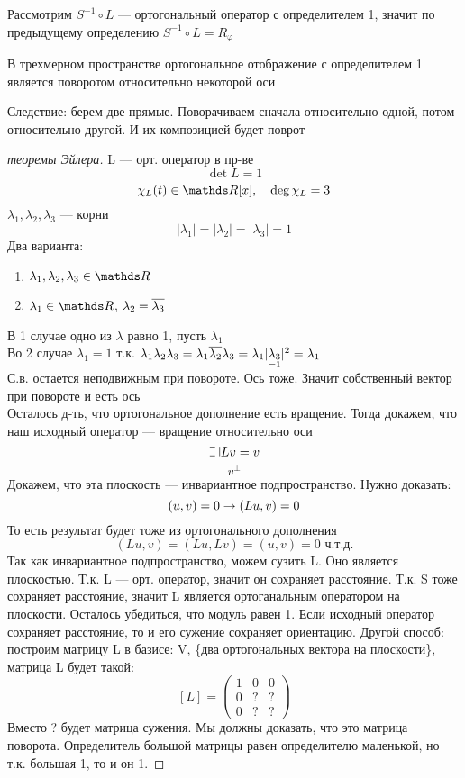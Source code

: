 \documentclass[main]{subfiles}
\begin{document}
    Рассмотрим $S^{-1} \circ L$ --- ортогональный оператор с определителем 1, значит по предыдущему определению $S^{-1} \circ L = R_{\varphi}$

    \begin{utv}
        В трехмерном пространстве ортогональное отображение с определителем 1 является поворотом относительно некоторой оси
    \end{utv}

    Следствие: берем две прямые. Поворачиваем сначала относительно одной, потом относительно другой. И их композицией будет поврот

    \begin{proof}[теоремы Эйлера]
        L --- орт. оператор в пр-ве
        \[\det L = 1\]
        \[\chi_L(t) \in \R[x],\q \deg \chi_L = 3\]
        $\lambda_1, \lambda_2, \lambda_3$ --- корни
        \[|\lambda_1| = |\lambda_2| = |\lambda_3| = 1\]
        Два варианта:
        \begin{enumerate}
            \item $\lambda_1, \lambda_2, \lambda_3 \in \R$
            \item $\lambda_1 \in \R$, $\lambda_2 = \overline{\lambda_3}$
        \end{enumerate}
        В 1 случае одно из $\lambda$ равно 1, пусть $\lambda_1$\\
        Во 2 случае $\lambda_1 = 1$ т.к. $\lambda_1 \lambda_2 \lambda_3 = \lambda_1 \overline{\lambda_2} \lambda_3 = \lambda_1 |\underset{=1}{\lambda_3}|^2 = \lambda_1$\\
        С.в. остается неподвижным при повороте. Ось тоже. Значит собственный вектор  при повороте и есть ось\\
        Осталось д-ть, что ортогональное дополнение есть вращение. Тогда докажем, что наш исходный оператор --- вращение относительно оси
        \[\letus Lv = v\]
        \[v^{\bot}\]
        Докажем, что эта плоскость --- инвариантное подпространство. Нужно доказать:
        \[(u,v) = 0 \rightarrow (Lu, v) = 0\]
        То есть результат будет тоже из ортогонального дополнения
        \[(Lu,v) = (Lu, Lv) = (u,v) = 0 \text{ ч.т.д.}\]
        Так как инвариантное подпространство, можем сузить L. Оно является плоскостью. Т.к. L --- орт. оператор, значит он сохраняет расстояние. Т.к. S тоже сохраняет расстояние, значит L является ортоганальным оператором на плоскости. Осталось убедиться, что модуль равен 1. Если исходный оператор сохраняет расстояние, то и его сужение сохраняет ориентацию. Другой способ: построим матрицу L в базисе: V, \{два ортогональных вектора на плоскости\}, матрица L будет такой:\\
        \[[L] = \begin{pmatrix}
            1 & 0 & 0\\
            0 & ? & ?\\
            0 & ? & ?
        \end{pmatrix}\]
        Вместо ? будет матрица сужения. Мы должны доказать, что это матрица поворота. Определитель большой матрицы равен определителю маленькой, но т.к. большая 1, то и он 1.


\end{proof}
\end{document}
